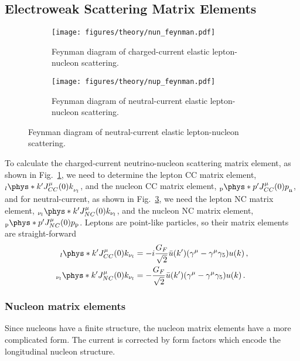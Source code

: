 \subsection{Electroweak Scattering Matrix Elements}

  \begin{figure}[h]
    \centering
    \begin{subfigure}{2.5in}
      \texttt{[image: figures/theory/nun\_feynman.pdf]}
      \caption{Feynman diagram of charged-current elastic lepton-nucleon
      scattering.}
      \label{fig:ccqefeynman}
    \end{subfigure}
    \hspace{2pt}
    \begin{subfigure}{2.5in}
      \texttt{[image: figures/theory/nup\_feynman.pdf]}
      \caption{Feynman diagram of neutral-current elastic lepton-nucleon
      scattering.}
      \label{fig:ncefeynman}
    \end{subfigure}
  \end{figure}

  To calculate the charged-current neutrino-nucleon scattering matrix element,
  as shown in Fig.~\ref{fig:ccqefeynman}, we need to determine the lepton CC
  matrix element, $_{l}{\phys*{k'}{J^{\mu}_{CC}(0)}{k}}_{\nu_l}$, and the nucleon
  CC matrix element, $_{\textrm{p}}{\phys*{p'}{J^{\mu}_{CC}(0)}{p}}_{\textrm{n}}$,
  and for neutral-current, as shown in Fig.~\ref{fig:ncefeynman}, we need the
  lepton NC matrix element, $_{\nu_l}\phys*{k'}{J^{\mu}_{NC}(0)}{k}_{\nu_l}$, and
  the nucleon NC matrix element,
  $_{\textrm{p}}\phys*{p'}{J^{\mu}_{NC}(0)}{p}_{\textrm{p}}$. Leptons are
  point-like particles, so their matrix elements are straight-forward
  \begin{equation}\label{eq:leptonmatel}
    \begin{aligned}
      _l\phys*{k'}{J^{\mu}_{CC}(0)}{k}_{\nu_l}
        &= -i\frac{G_F}{\sqrt{2}}\bar{u}(k')(\gamma^{\mu} - \gamma^{\mu}\gamma_5)u(k) \,, \\
        _{\nu_l}\phys*{k'}{J^{\mu}_{NC}(0)}{k}_{\nu_l}
        &= -\frac{G_F}{\sqrt{2}}\bar{u}(k')(\gamma^{\mu} - \gamma^{\mu}\gamma_5)u(k) \,.
    \end{aligned}
  \end{equation}

  \subsubsection{Nucleon matrix elements}
  Since nucleons have a finite structure, the nucleon matrix elements have a
  more complicated form. The current is corrected by form factors which encode
  the longitudinal nucleon structure.

